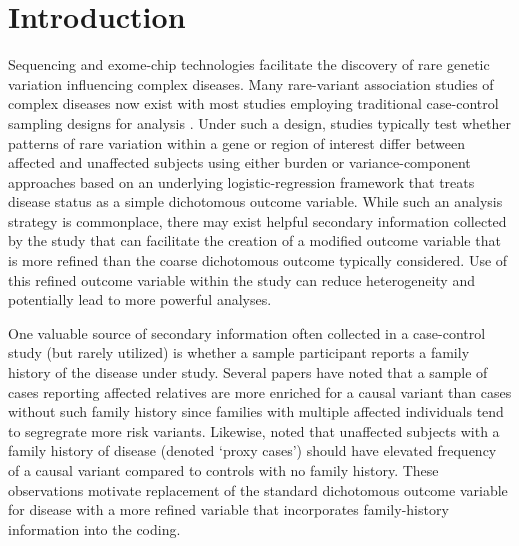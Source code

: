 \documentclass[]{article}
\begin{document}
\pagebreak

\hypertarget{introduction}{%
\section{Introduction}\label{introduction}}

Sequencing and exome-chip technologies facilitate the discovery of rare genetic variation influencing complex diseases. Many rare-variant association studies of complex diseases now exist with most studies employing traditional case-control sampling designs for analysis \citep{DeRubeis2014, Sanders2017}. Under such a design, studies typically test whether patterns of rare variation within a gene or region of interest differ between affected and unaffected subjects using either burden \citep{Li2008, Madsen2009} or variance-component \citep{Wu2011} approaches based on an underlying logistic-regression framework that treats disease status as a simple dichotomous outcome variable. While such an analysis strategy is commonplace, there may exist helpful secondary information collected by the study that can facilitate the creation of a modified outcome variable that is more refined than the coarse dichotomous outcome typically considered. Use of this refined outcome variable within the study can reduce heterogeneity and potentially lead to more powerful analyses.

One valuable source of secondary information often collected in a case-control study (but rarely utilized) is whether a sample participant reports a family history of the disease under study. Several papers have noted that a sample of cases reporting affected relatives are more enriched for a causal variant than cases without such family history \citep{TengRisch1999, Zollner2012, Epstein2015} since families with multiple affected individuals tend to segregrate more risk variants.
Likewise, \citet{Liu2017} noted that unaffected subjects with a family history of disease (denoted `proxy cases') should have elevated frequency of a causal variant compared to controls with no family history. These observations motivate replacement of the standard dichotomous outcome variable for disease with a more refined variable that incorporates family-history information into the coding.
\end{document}
